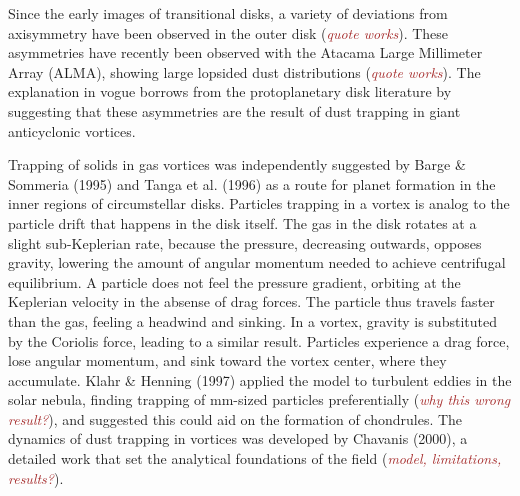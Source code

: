 \documentclass[apj]{emulateapj}
\def\brown#1{\textcolor{brown}{#1}}
\newcommand{\comm}[1]{({\it \brown{#1}})}
\begin{document}
%
%
% 






% 



Since the early images of transitional disks, a variety of deviations
from axisymmetry have been observed in the outer disk \comm{quote works}. These asymmetries 
have recently been observed with the Atacama Large Millimeter Array
(ALMA), showing large lopsided dust distributions \comm{quote works}. The explanation in
vogue borrows from the protoplanetary disk literature by suggesting that these asymmetries are the
result of dust trapping in giant anticyclonic vortices. 

Trapping of solids in gas vortices was independently suggested
by Barge \& Sommeria (1995) and Tanga et al. (1996) as a route for
planet formation in the inner regions of circumstellar
disks. Particles trapping in a vortex is analog to the particle drift
that happens in the disk
itself. The gas in the disk rotates at a slight sub-Keplerian rate,
because the pressure, decreasing outwards, opposes gravity,
lowering the amount of angular momentum needed to achieve centrifugal
equilibrium. A particle does not feel the pressure gradient, orbiting at
the Keplerian velocity in the absense of drag forces. The particle
thus travels faster than the gas, feeling a
headwind and sinking. In a vortex, gravity is substituted by the
Coriolis force, leading to a similar result. Particles experience a
drag force, lose angular momentum, and sink toward the vortex
center, where they accumulate. Klahr \& Henning (1997) applied the model 
to turbulent eddies in the solar nebula, finding trapping of mm-sized
particles preferentially \comm{why this wrong result?}, and suggested
this could aid on the formation of chondrules. The dynamics of dust
trapping in vortices was developed by Chavanis (2000), a detailed work 
that set the analytical foundations of the field \comm{model,
  limitations, results?}.  
\end{document}
